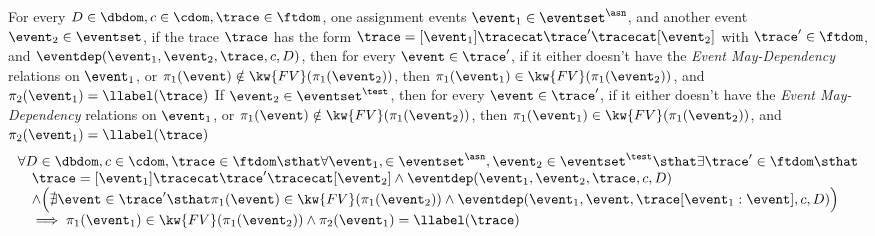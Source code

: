 \begin{lem}
	\label{lem:inv_indepevents_ctl}
	For every $D \in \dbdom , c \in \cdom, \trace \in \ftdom$, one assignment events 
	$\event_1\in \eventset^{\asn}$, and another event $\event_2 \in \eventset$,
	if the trace $\trace$ has the form $\trace = [\event_1] \tracecat \trace' \tracecat [\event_2]$ with $\trace' \in \ftdom$, 
	and $\eventdep(\event_1, \event_2, \trace, c, D)$,
then for every $\event \in \trace'$, if it either doesn't have the \emph{Event May-Dependency} relations on $\event_1$,
or $\pi_1(\event) \notin \kw{FV}(\pi_1(\event_2)) $,
then 
$\pi_1(\event_1) \in \kw{FV}(\pi_1(\event_2))$, and $ {\pi_2(\event_1)} = \llabel(\trace)$
%
If $\event_2 \in \eventset^{\test}$, 
then for every $\event \in \trace'$, if it either doesn't have the \emph{Event May-Dependency} relations on $\event_1$,
or $\pi_1(\event) \notin \kw{FV}(\pi_1(\event_2)) $,
then 
$\pi_1(\event_1) \in \kw{FV}(\pi_1(\event_2))$, and $ {\pi_2(\event_1)} = \llabel(\trace)$
%
\[
\begin{array}{l}
	\forall D \in \dbdom , c \in \cdom, \trace \in \ftdom \sthat  \forall \event_1,\in \eventset^{\asn}, \event_2 \in \eventset^{\test} \sthat 
	 \exists \trace' \in \ftdom \sthat
	 \\ \quad 
	 \trace = [\event_1] \tracecat \trace' \tracecat [\event_2]
	 \land
	\eventdep(\event_1, \event_2, \trace, c, D) 
	\\ \quad 
	\land 
	\Big( \nexists \event \in \trace' \sthat  
	\pi_1(\event) \in \kw{FV}(\pi_1(\event_2)) \land
	\eventdep(\event_1, \event, \trace[\event_1:\event], c, D)
	\Big) 
	\\ \quad 
	\implies 
	\pi_1(\event_1) \in \kw{FV}(\pi_1(\event_2)) \land {\pi_2(\event_1)} = \llabel(\trace)
\end{array}
\]
\end{lem}
%
